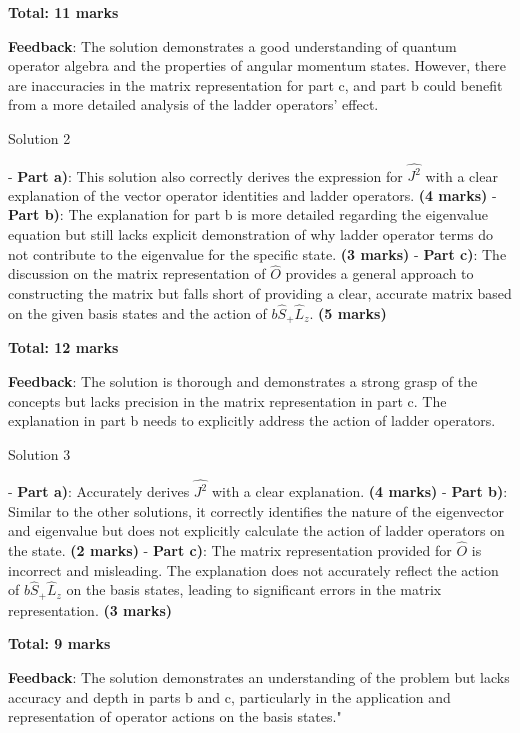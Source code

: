 \documentclass[a4paper,11pt]{article}
\begin{document}
\textbf{Total: 11 marks}

\textbf{Feedback}: The solution demonstrates a good understanding of quantum operator algebra and the properties of angular momentum states. However, there are inaccuracies in the matrix representation for part c, and part b could benefit from a more detailed analysis of the ladder operators' effect.

Solution 2

- \textbf{Part a)}: This solution also correctly derives the expression for \( \hat{J^{2}} \) with a clear explanation of the vector operator identities and ladder operators. \textbf{(4 marks)}
- \textbf{Part b)}: The explanation for part b is more detailed regarding the eigenvalue equation but still lacks explicit demonstration of why ladder operator terms do not contribute to the eigenvalue for the specific state. \textbf{(3 marks)}
- \textbf{Part c)}: The discussion on the matrix representation of \( \hat{O} \) provides a general approach to constructing the matrix but falls short of providing a clear, accurate matrix based on the given basis states and the action of \( b\hat{S}_{+}\hat{L}_{z} \). \textbf{(5 marks)}

\textbf{Total: 12 marks}

\textbf{Feedback}: The solution is thorough and demonstrates a strong grasp of the concepts but lacks precision in the matrix representation in part c. The explanation in part b needs to explicitly address the action of ladder operators.

Solution 3

- \textbf{Part a)}: Accurately derives \( \hat{J^{2}} \) with a clear explanation. \textbf{(4 marks)}
- \textbf{Part b)}: Similar to the other solutions, it correctly identifies the nature of the eigenvector and eigenvalue but does not explicitly calculate the action of ladder operators on the state. \textbf{(2 marks)}
- \textbf{Part c)}: The matrix representation provided for \( \hat{O} \) is incorrect and misleading. The explanation does not accurately reflect the action of \( b\hat{S}_{+}\hat{L}_{z} \) on the basis states, leading to significant errors in the matrix representation. \textbf{(3 marks)}

\textbf{Total: 9 marks}

\textbf{Feedback}: The solution demonstrates an understanding of the problem but lacks accuracy and depth in parts b and c, particularly in the application and representation of operator actions on the basis states."
\end{document}
